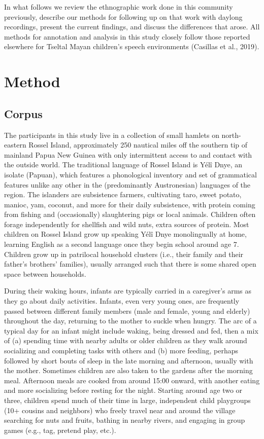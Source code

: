 \documentclass[,man,floatsintext]{apa6}
\begin{document}
In what follows we review the ethnographic work done in this community
previously, describe our methods for following up on that work with
daylong recordings, present the current findings, and discuss the
differences that arose. All methods for annotation and analysis in this
study closely follow those reported elsewhere for Tseltal Mayan
children's speech environments (Casillas et al., 2019).

\section{Method}\label{methods}

\subsection{Corpus}\label{methods-dataset}

The participants in this study live in a collection of small hamlets on
north-eastern Rossel Island, approximately 250 nautical miles off the
southern tip of mainland Papua New Guinea with only intermittent access
to and contact with the outside world. The traditional language of
Rossel Island is Yélî Dnye, an isolate (Papuan), which features a
phonological inventory and set of grammatical features unlike any other
in the (predominantly Austronesian) languages of the region. The
islanders are subsistence farmers, cultivating taro, sweet potato,
manioc, yam, coconut, and more for their daily subsistence, with protein
coming from fishing and (occasionally) slaughtering pigs or local
animals. Children often forage independently for shellfish and wild
nuts, extra sources of protein. Most children on Rossel Island grow up
speaking Yélî Dnye monolingually at home, learning English as a second
language once they begin school around age 7. Children grow up in
patrilocal household clusters (i.e., their family and their father's
brothers' families), usually arranged such that there is some shared
open space between households.

During their waking hours, infants are typically carried in a
caregiver's arms as they go about daily activities. Infants, even very
young ones, are frequently passed between different family members (male
and female, young and elderly) throughout the day, returning to the
mother to suckle when hungry. The arc of a typical day for an infant
might include waking, being dressed and fed, then a mix of (a) spending
time with nearby adults or older children as they walk around
socializing and completing tasks with others and (b) more feeding,
perhaps followed by short bouts of sleep in the late morning and
afternoon, usually with the mother. Sometimes children are also taken to
the gardens after the morning meal. Afternoon meals are cooked from
around 15:00 onward, with another eating and more socializing before
resting for the night. Starting around age two or three, children spend
much of their time in large, independent child playgroups (10+ cousins
and neighbors) who freely travel near and around the village searching
for nuts and fruits, bathing in nearby rivers, and engaging in group
games (e.g., tag, pretend play, etc.).
\end{document}
